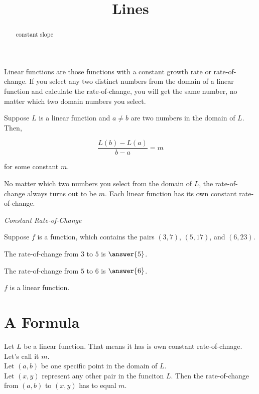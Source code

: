 \documentclass{ximera}
\title{Lines}
\begin{document}
\begin{abstract}
constant slope
\end{abstract}
\maketitle


Linear functions are those functions with a constant growth rate or rate-of-change.  If you select any two distinct numbers from the domain of a linear function and calculate the rate-of-change, you will get the same number, no matter which two domain numbers you select.

Suppose $L$ is a linear function and $a \ne b$ are two numbers in the domain of $L$. Then, 

\[    \frac{L(b) - L(a)}{b - a} = m   \]

for some constant $m$.


No matter which two numbers you select from the domain of $L$, the rate-of-change always turns out to be $m$.  Each linear function has its own constant rate-of-change.



\begin{example} \textit{Constant Rate-of-Change}


Suppose $f$ is a function, which contains the pairs $(3, 7)$, $(5, 17)$, and $(6, 23)$.


The rate-of-change from $3$ to $5$ is $\answer{5}$.

The rate-of-change from $5$ to $6$ is $\answer{6}$.

$f$ is a linear function.
\begin{multipleChoice}
\end{multipleChoice}


\end{example}



\section{A Formula}

Let $L$ be a linear function.  That means it has is own constant rate-of-chnage.  Let's call it $m$. \\

Let $(a, b)$ be one specific point in the domain of $L$.\\


Let $(x, y)$ represent any other pair in the funciton $L$. Then the rate-of-change from $(a,b)$ to $(x, y)$ has to equal $m$.
\end{document}
